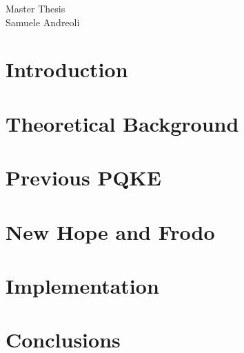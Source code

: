 \documentclass[a4paper]{book}
\begin{document}

\begin{titlepage}
\begin{center}
Master Thesis \\
Samuele Andreoli \\  
\end{center}
\end{titlepage}

\chapter*{Introduction}\label{ch:introduction}


\tableofcontents


\chapter{Theoretical Background}\label{ch:th_background}


\chapter{Previous PQKE}


\chapter{New Hope and Frodo}\label{ch:protocols}


\chapter{Implementation}\label{ch:implementation}


\chapter*{Conclusions}\label{ch:conclusions}


{}

\end{document}
